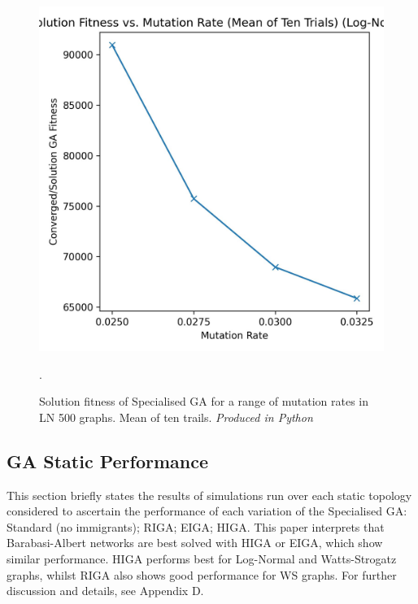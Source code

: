 \documentclass[
	a4paper, %
	10pt, %
	unnumberedsections, %
	twoside, %
]{LTJournalArticle}
\begin{document}
\begin{figure}[H]
	\includegraphics[width=\linewidth]{Figures/sims/mutation/mutation_v_fitness.jpg}
	\caption{Solution fitness of Specialised GA for a range of mutation rates in LN 500 graphs. Mean of ten trails.  \emph{Produced in Python}}. 
	\label{fig:mutation_v_fitness}
\end{figure}

\subsection{GA Static Performance}

This section briefly states the results of simulations run over each static topology considered to ascertain the performance of each variation of the Specialised GA: Standard (no immigrants); RIGA; EIGA; HIGA. This paper interprets that Barabasi-Albert networks are best solved with HIGA or EIGA, which show similar performance. HIGA performs best for Log-Normal and Watts-Strogatz graphs, whilst RIGA also shows good performance for WS graphs. For further discussion and details, see Appendix D. 
\end{document}
